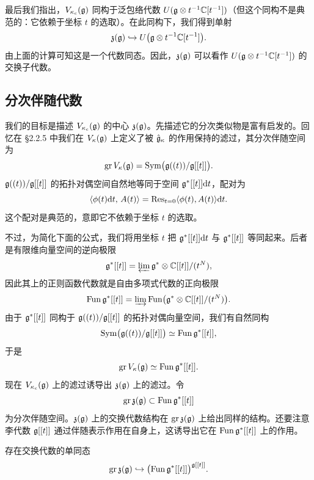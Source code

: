 最后我们指出，$V_{\kappa_c}(\mathfrak{g})$ 同构于泛包络代数 $U(\mathfrak{g}\otimes t^{-1}\mathbb{C}[t^{-1}])$（但这个同构不是典范的：它依赖于坐标 $t$ 的选取）。在此同构下，我们得到单射
\[
    \mathfrak z(\mathfrak{g})\hookrightarrow U\bigl(\mathfrak{g}\otimes t^{-1}\mathbb{C}[t^{-1}]\bigr).
\]
由上面的计算可知这是一个代数同态。因此，$\mathfrak z(\mathfrak{g})$ 可以看作 $U(\mathfrak{g}\otimes t^{-1}\mathbb{C}[t^{-1}])$ 的交换子代数。

\subsection{分次伴随代数}

我们的目标是描述 $V_{\kappa_c}(\mathfrak{g})$ 的中心 $\mathfrak z(\mathfrak{g})$。先描述它的分次类似物是富有启发的。回忆在 §2.2.5 中我们在 $V_\kappa(\mathfrak{g})$ 上定义了被 $\hat{\mathfrak{g}}_\kappa$ 的作用保持的滤过，其分次伴随空间为
\[
    \operatorname{gr} V_\kappa(\mathfrak{g}) = \operatorname{Sym}\bigl(\mathfrak{g}((t))/\mathfrak{g}[[t]]\bigr).
\]
$\mathfrak{g}((t))/\mathfrak{g}[[t]]$ 的拓扑对偶空间自然地等同于空间 $\mathfrak{g}^*[[t]]\mathrm{d} t$，配对为
\[
    \langle \phi(t)\mathrm{d} t,\, A(t)\rangle = \operatorname{Res}_{t=0}\langle \phi(t), A(t)\rangle \mathrm{d} t.
\]
这个配对是典范的，意即它不依赖于坐标 $t$ 的选取。

不过，为简化下面的公式，我们将用坐标 $t$ 把 $\mathfrak{g}^*[[t]]\mathrm{d} t$ 与 $\mathfrak{g}^*[[t]]$ 等同起来。后者是有限维向量空间的逆向极限
\[
    \mathfrak{g}^*[[t]] = \varprojlim \mathfrak{g}^*\otimes\mathbb{C}[[t]]/(t^N),
\]
因此其上的正则函数代数就是自由多项式代数的正向极限
\[
    \operatorname{Fun}\mathfrak{g}^*[[t]] = \varinjlim \operatorname{Fun}\bigl(\mathfrak{g}^*\otimes\mathbb{C}[[t]]/(t^N)\bigr).
\]
由于 $\mathfrak{g}^*[[t]]$ 同构于 $\mathfrak{g}((t))/\mathfrak{g}[[t]]$ 的拓扑对偶向量空间，我们有自然同构
\[
    \operatorname{Sym}\bigl(\mathfrak{g}((t))/\mathfrak{g}[[t]]\bigr) \simeq \operatorname{Fun}\mathfrak{g}^*[[t]],
\]
于是
\[
    \operatorname{gr} V_\kappa(\mathfrak{g}) \simeq \operatorname{Fun}\mathfrak{g}^*[[t]].
\]
现在 $V_{\kappa_c}(\mathfrak{g})$ 上的滤过诱导出 $\mathfrak z(\mathfrak{g})$ 上的滤过。令
\[
    \operatorname{gr}\mathfrak z(\mathfrak{g}) \subset \operatorname{Fun}\mathfrak{g}^*[[t]]
\]
为分次伴随空间。$\mathfrak z(\mathfrak{g})$ 上的交换代数结构在 $\operatorname{gr}\mathfrak z(\mathfrak{g})$ 上给出同样的结构。还要注意李代数 $\mathfrak{g}[[t]]$ 通过伴随表示作用在自身上，这诱导出它在 $\operatorname{Fun}\mathfrak{g}^*[[t]]$ 上的作用。

\begin{lemma}
    存在交换代数的单同态
    \[
        \operatorname{gr}\mathfrak z(\mathfrak{g}) \hookrightarrow
        \bigl(\operatorname{Fun}\mathfrak{g}^*[[t]]\bigr)^{\mathfrak{g}[[t]]}.
    \]
\end{lemma}

